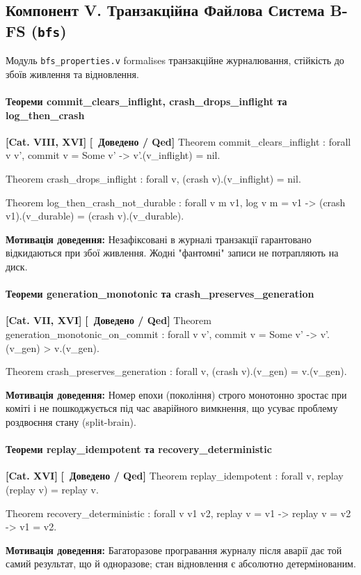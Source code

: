 \documentclass{article}
\let\originalfootnotesize\footnotesize
\let\oldverbatim\verbatim
\let\oldendverbatim\endverbatim
\renewenvironment{verbatim}{\originalfootnotesize\oldverbatim}{\oldendverbatim}
\newcommand{\thmcategory}[1]{{\small\textbf{\color{coreblue}[#1]}}}
\newcommand{\thmproven}{{\small\textbf{\color{productgreen}[\checkmark\ Доведено / Qed]}}}
\newcommand{\thmmotivation}[1]{%
  \par\smallskip\noindent\colorbox{boxbg}{\parbox{\dimexpr\linewidth-2\fboxsep\relax}{%
    \small\textbf{Мотивація доведення:} #1%
  }}\par\medskip
}
\begin{document}
\subsection[Компонент V. Транзакційна Файлова Система B-FS]{Компонент V. Транзакційна Файлова Система B-FS (\texttt{bfs})}

Модуль \texttt{bfs\_properties.v} formalises транзакційне журналювання, стійкість до збоїв живлення та відновлення.

\paragraph{Теореми commit\_clears\_inflight, crash\_drops\_inflight та log\_then\_crash} \thmcategory{Cat. VIII, XVI} \thmproven
\begin{verbatim}
Theorem commit_clears_inflight : forall v v',
  commit v = Some v' -> v'.(v_inflight) = nil.

Theorem crash_drops_inflight : forall v,
  (crash v).(v_inflight) = nil.

Theorem log_then_crash_not_durable : forall v m v1,
  log v m = v1 ->
  (crash v1).(v_durable) = (crash v).(v_durable).
\end{verbatim}
\thmmotivation{Незафіксовані в журналі транзакції гарантовано відкидаються при збої живлення. Жодні "фантомні" записи не потрапляють на диск.}

\paragraph{Теореми generation\_monotonic та crash\_preserves\_generation} \thmcategory{Cat. VII, XVI} \thmproven
\begin{verbatim}
Theorem generation_monotonic_on_commit : forall v v',
  commit v = Some v' -> v'.(v_gen) > v.(v_gen).

Theorem crash_preserves_generation : forall v,
  (crash v).(v_gen) = v.(v_gen).
\end{verbatim}
\thmmotivation{Номер епохи (покоління) строго монотонно зростає при коміті і не пошкоджується під час аварійного вимкнення, що усуває проблему роздвоєння стану (split-brain).}

\paragraph{Теореми replay\_idempotent та recovery\_deterministic} \thmcategory{Cat. XVI} \thmproven
\begin{verbatim}
Theorem replay_idempotent : forall v,
  replay (replay v) = replay v.

Theorem recovery_deterministic : forall v v1 v2,
  replay v = v1 -> replay v = v2 -> v1 = v2.
\end{verbatim}
\thmmotivation{Багаторазове програвання журналу після аварії дає той самий результат, що й одноразове; стан відновлення є абсолютно детермінованим.}
\end{document}
